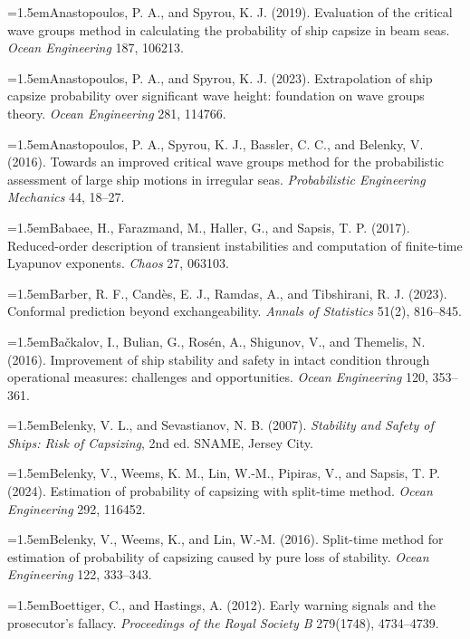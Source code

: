 \documentclass[11pt]{article}
\begin{document}
\hangindent=1.5em\noindent Anastopoulos, P. A., and Spyrou, K. J. (2019). Evaluation of the critical wave groups method in calculating the probability of ship capsize in beam seas. \emph{Ocean Engineering} 187, 106213.\par
\hangindent=1.5em\noindent Anastopoulos, P. A., and Spyrou, K. J. (2023). Extrapolation of ship capsize probability over significant wave height: foundation on wave groups theory. \emph{Ocean Engineering} 281, 114766.\par
\hangindent=1.5em\noindent Anastopoulos, P. A., Spyrou, K. J., Bassler, C. C., and Belenky, V. (2016). Towards an improved critical wave groups method for the probabilistic assessment of large ship motions in irregular seas. \emph{Probabilistic Engineering Mechanics} 44, 18--27.\par
\hangindent=1.5em\noindent Babaee, H., Farazmand, M., Haller, G., and Sapsis, T. P. (2017). Reduced-order description of transient instabilities and computation of finite-time Lyapunov exponents. \emph{Chaos} 27, 063103.\par
\hangindent=1.5em\noindent Barber, R. F., Cand\`es, E. J., Ramdas, A., and Tibshirani, R. J. (2023). Conformal prediction beyond exchangeability. \emph{Annals of Statistics} 51(2), 816--845.\par
\hangindent=1.5em\noindent Ba\v{c}kalov, I., Bulian, G., Ros\'en, A., Shigunov, V., and Themelis, N. (2016). Improvement of ship stability and safety in intact condition through operational measures: challenges and opportunities. \emph{Ocean Engineering} 120, 353--361.\par
\hangindent=1.5em\noindent Belenky, V. L., and Sevastianov, N. B. (2007). \emph{Stability and Safety of Ships: Risk of Capsizing}, 2nd ed. SNAME, Jersey City.\par
\hangindent=1.5em\noindent Belenky, V., Weems, K. M., Lin, W.-M., Pipiras, V., and Sapsis, T. P. (2024). Estimation of probability of capsizing with split-time method. \emph{Ocean Engineering} 292, 116452.\par
\hangindent=1.5em\noindent Belenky, V., Weems, K., and Lin, W.-M. (2016). Split-time method for estimation of probability of capsizing caused by pure loss of stability. \emph{Ocean Engineering} 122, 333--343.\par
\hangindent=1.5em\noindent Boettiger, C., and Hastings, A. (2012). Early warning signals and the prosecutor's fallacy. \emph{Proceedings of the Royal Society B} 279(1748), 4734--4739.\par
\end{document}
